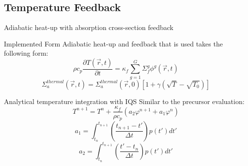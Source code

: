 \documentclass[8pt,xcolor=dvipnames]{beamer}
\newcommand{\be}{\begin{equation*}}
\newcommand{\ee}{\end{equation*}}
\begin{document}
\subsection{Temperature Feedback}

\begin{frame}{Adiabatic heat-up with absorption cross-section feedback}

\begin{block}{Implemented Form}
Adiabatic heat-up and feedback that is used takes the following form:
\be
\rho c_p \frac{\partial T(\vec{r},t)}{\partial t} = \kappa_f \sum^G_{g=1}\Sigma_f^g \phi^g(\vec{r},t)
\ee
\be
\Sigma_a^{thermal}(\vec{r},t) = \Sigma_a^{thermal}(\vec{r},0)\left[1+\gamma\left(\sqrt{T}-\sqrt{T_0}\right)\right]
\ee
\end{block}

\begin{block}{Analytical temperature integration with IQS}
Similar to the precursor evaluation:
\be
T^{n+1} = T^n + \frac{\kappa_f}{\rho c_p} \left(a_2 \varphi^{n+1} + a_1 \varphi^{n}\right)
\label{eq:temp_an}
\ee
\be
a_1 = \int_{t_n}^{t_{n+1}}\left(\frac{t_{n+1}-t'}{\Delta t}\right)p(t')dt'
\label{eq:a1}
\ee
\be
a_2 = \int_{t_n}^{t_{n+1}}\left(\frac{t'-t_n}{\Delta t}\right)p(t')dt'
\label{eq:a2}
\ee
\end{block}

\end{frame}
\end{document}
